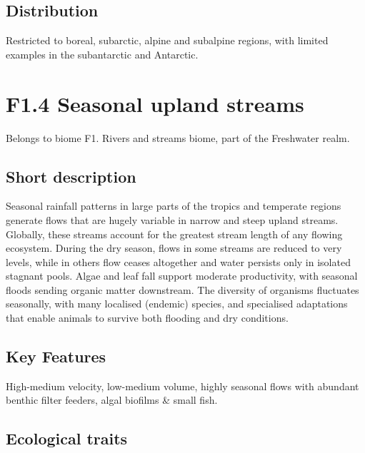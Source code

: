 \documentclass[
  letterpaper,
  DIV=11,
  numbers=noendperiod]{scrartcl}
\begin{document}
\subsection{Distribution}\label{distribution-2}

Restricted to boreal, subarctic, alpine and subalpine regions, with
limited examples in the subantarctic and Antarctic.

\section{F1.4 Seasonal upland
streams}\label{f1.4-seasonal-upland-streams}

Belongs to biome F1. Rivers and streams biome, part of the Freshwater
realm.

\subsection{Short description}\label{short-description-3}

Seasonal rainfall patterns in large parts of the tropics and temperate
regions generate flows that are hugely variable in narrow and steep
upland streams. Globally, these streams account for the greatest stream
length of any flowing ecosystem. During the dry season, flows in some
streams are reduced to very levels, while in others flow ceases
altogether and water persists only in isolated stagnant pools. Algae and
leaf fall support moderate productivity, with seasonal floods sending
organic matter downstream. The diversity of organisms fluctuates
seasonally, with many localised (endemic) species, and specialised
adaptations that enable animals to survive both flooding and dry
conditions.

\subsection{Key Features}\label{key-features-3}

High-medium velocity, low-medium volume, highly seasonal flows with
abundant benthic filter feeders, algal biofilms \& small fish.

\subsection{Ecological traits}\label{ecological-traits-3}
\end{document}

